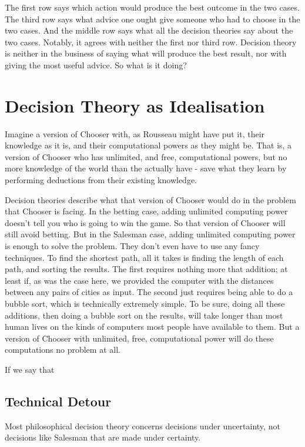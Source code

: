 \documentclass[
  11pt,
  letterpaper,
  DIV=11,
  numbers=noendperiod,
  oneside]{scrartcl}
\begin{document}
The first row says which action would produce the best outcome in the
two cases. The third row says what advice one ought give someone who had
to choose in the two cases. And the middle row says what all the
decision theories say about the two cases. Notably, it agrees with
neither the first nor third row. Decision theory is neither in the
business of saying what will produce the best result, nor with giving
the most useful advice. So what is it doing?

\section{Decision Theory as
Idealisation}\label{decision-theory-as-idealisation}

Imagine a version of Chooser with, as Rousseau might have put it, their
knowledge as it is, and their computational powers as they might be.
That is, a version of Chooser who has unlimited, and free, computational
powers, but no more knowledge of the world than the actually have - save
what they learn by performing deductions from their existing knowledge.

Decision theories describe what that version of Chooser would do in the
problem that Chooser is facing. In the betting case, adding unlimited
computing power doesn't tell you who is going to win the game. So that
version of Chooser will still avoid betting. But in the Salesman case,
adding unlimited computing power is enough to solve the problem. They
don't even have to use any fancy techniques. To find the shortest path,
all it takes is finding the length of each path, and sorting the
results. The first requires nothing more that addition; at least if, as
was the case here, we provided the computer with the distances between
any pairs of cities as input. The second just requires being able to do
a bubble sort, which is technically extremely simple. To be sure, doing
all these additions, then doing a bubble sort on the results, will take
longer than most human lives on the kinds of computers most people have
available to them. But a version of Chooser with unlimited, free,
computational power will do these computations no problem at all.

If we say that

\subsection{Technical Detour}\label{technical-detour}

Most philosophical decision theory concerns decisions under uncertainty,
not decisions like Salesman that are made under certainty.
\end{document}
